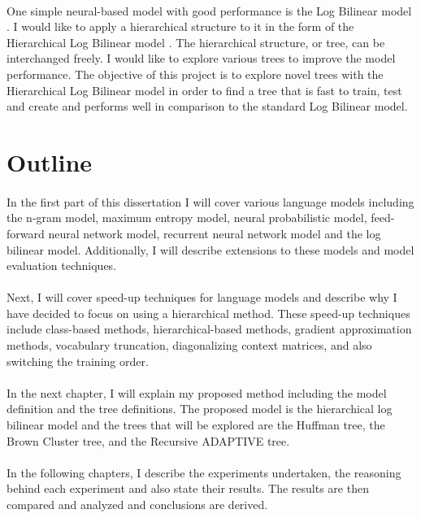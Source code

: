 \paragraph{}
One simple neural-based model with good performance is the Log Bilinear model \cite{MnihHinton2007}. I would like to apply a hierarchical structure to it in the form of the Hierarchical Log Bilinear model \cite{MnihHinton2009}. The hierarchical structure, or tree, can be interchanged freely. I would like to explore various trees to improve the model performance. The objective of this project is to explore novel trees with the Hierarchical Log Bilinear model in order to find a tree that is fast to train, test and create and performs well in comparison to the standard Log Bilinear model.

\section{Outline}
\paragraph{}
In the first part of this dissertation I will cover various language models including the n-gram model, maximum entropy model, neural probabilistic model, feed-forward neural network model, recurrent neural network model and the log bilinear model. Additionally, I will describe extensions to these models and model evaluation techniques.

\paragraph{}
Next, I will cover speed-up techniques for language models and describe why I have decided to focus on using a hierarchical method. These speed-up techniques include class-based methods, hierarchical-based methods, gradient approximation methods, vocabulary truncation, diagonalizing context matrices, and also switching the training order.

\paragraph{}
In the next chapter, I will explain my proposed method including the model definition and the tree definitions. The proposed model is the hierarchical log bilinear model and the trees that will be explored are the Huffman tree, the Brown Cluster tree, and the Recursive ADAPTIVE tree.

\paragraph{}
In the following chapters, I describe the experiments undertaken, the reasoning behind each experiment and also state their results. The results are then compared and analyzed and conclusions are derived.

